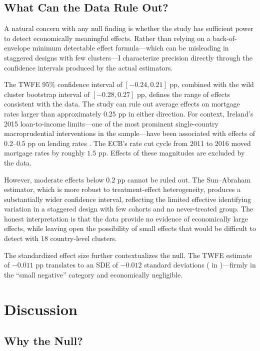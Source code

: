 \documentclass[12pt]{article}
\begin{document}
\subsection{What Can the Data Rule Out?}

A natural concern with any null finding is whether the study has sufficient power to detect economically meaningful effects. Rather than relying on a back-of-envelope minimum detectable effect formula---which can be misleading in staggered designs with few clusters---I characterize precision directly through the confidence intervals produced by the actual estimators.

The TWFE 95\% confidence interval of $[-0.24, 0.21]$ pp, combined with the wild cluster bootstrap interval of $[-0.28, 0.27]$ pp, defines the range of effects consistent with the data. The study can rule out average effects on mortgage rates larger than approximately $0.25$ pp in either direction. For context, Ireland's 2015 loan-to-income limits---one of the most prominent single-country macroprudential interventions in the sample---have been associated with effects of $0.2$--$0.5$ pp on lending rates \citep{cerutti_2017_macropru}. The ECB's rate cut cycle from 2011 to 2016 moved mortgage rates by roughly $1.5$ pp. Effects of these magnitudes are excluded by the data.

However, moderate effects below $0.2$ pp cannot be ruled out. The Sun--Abraham estimator, which is more robust to treatment-effect heterogeneity, produces a substantially wider confidence interval, reflecting the limited effective identifying variation in a staggered design with few cohorts and no never-treated group. The honest interpretation is that the data provide no evidence of economically large effects, while leaving open the possibility of small effects that would be difficult to detect with 18 country-level clusters.

The standardized effect size further contextualizes the null. The TWFE estimate of $-0.011$ pp translates to an SDE of $-0.012$ standard deviations ( in )---firmly in the ``small negative'' category and economically negligible.


\section{Discussion}
\label{sec:discussion}

\subsection{Why the Null?}
\end{document}
